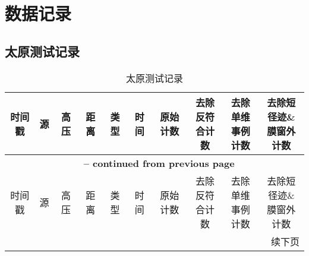 
\chapter{数据记录}

\section{太原测试记录}

\begin{center}
{ \tabcolsep=3pt
\begin{longtable}{c c c c c c c c c c}
    \caption{太原测试记录}
    \label{tab:sep_taiyuan} \\
    \toprule
    时间戳  &   源  &   高压    &   距离    &   类型    &   时间    &   原始计数    &   \makecell[c]{去除反符\\合计数}  &   \makecell[c]{去除单维\\事例计数}    &   \makecell[c]{去除短径迹\& \\ 膜窗外计数}  \\
    \midrule
    \endfirsthead

    \multicolumn{10}{c}{{\bfseries \tablename\ \thetable{} -- continued from previous page}} \\
    \toprule
    时间戳  &   源  &   高压    &   距离    &   类型    &   时间    &   原始计数    &   \makecell[c]{去除反符\\合计数}  &   \makecell[c]{去除单维\\事例计数}    &   \makecell[c]{去除短径迹\& \\ 膜窗外计数}  \\
    \midrule
    \endhead

    \bottomrule
    \multicolumn{10}{r}{续下页}
    \endfoot

    \bottomrule
    \endlastfoot


\end{longtable}}
\end{center}
